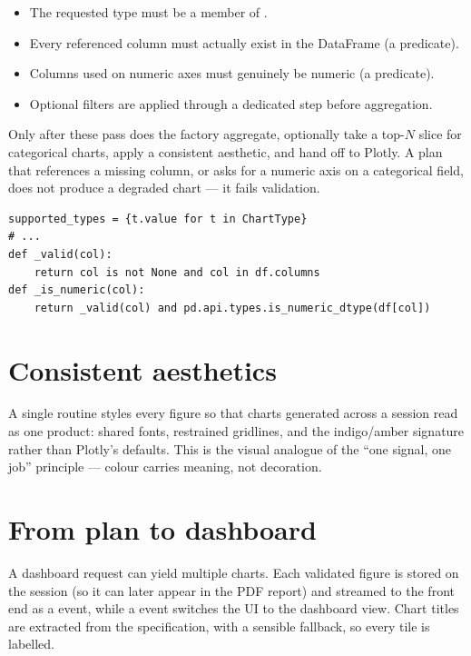 \begin{itemize}
  \item The requested type must be a member of .
  \item Every referenced column must actually exist in the DataFrame
        (a  predicate).
  \item Columns used on numeric axes must genuinely be numeric
        (a  predicate).
  \item Optional filters are applied through a dedicated 
        step before aggregation.
\end{itemize}

Only after these pass does the factory aggregate, optionally take a top-$N$
slice for categorical charts, apply a consistent aesthetic, and hand off to
Plotly. A plan that references a missing column, or asks for a numeric axis on a
categorical field, does not produce a degraded chart --- it fails validation.

\begin{lstlisting}[style=py,caption={Validation predicates inside \code{ChartFactory.generate\_chart}.}]
supported_types = {t.value for t in ChartType}
# ...
def _valid(col):
    return col is not None and col in df.columns
def _is_numeric(col):
    return _valid(col) and pd.api.types.is_numeric_dtype(df[col])
\end{lstlisting}

\section{Consistent aesthetics}
A single  routine styles every figure so that charts
generated across a session read as one product: shared fonts, restrained
gridlines, and the indigo/amber signature rather than Plotly's defaults. This is
the visual analogue of the ``one signal, one job'' principle --- colour carries
meaning, not decoration.

\section{From plan to dashboard}
A dashboard request can yield multiple charts. Each validated figure is stored
on the session (so it can later appear in the PDF report) and streamed to the
front end as a  event, while a  event switches the UI
to the dashboard view. Chart titles are extracted from the specification, with a
sensible fallback, so every tile is labelled.

